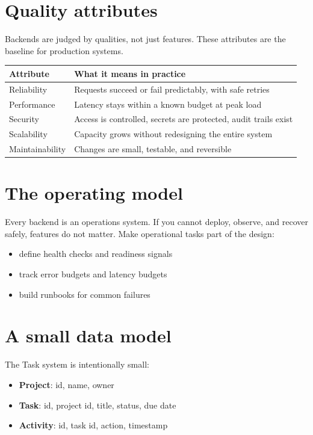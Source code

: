 \section{Quality attributes}
Backends are judged by qualities, not just features.
These attributes are the baseline for production systems.

\begin{tabularx}{\textwidth}{@{}lX@{}}
\toprule
Attribute & What it means in practice \\
\midrule
Reliability & Requests succeed or fail predictably, with safe retries \\
Performance & Latency stays within a known budget at peak load \\
Security & Access is controlled, secrets are protected, audit trails exist \\
Scalability & Capacity grows without redesigning the entire system \\
Maintainability & Changes are small, testable, and reversible \\
\bottomrule
\end{tabularx}

\section{The operating model}
Every backend is an operations system.
If you cannot deploy, observe, and recover safely, features do not matter.
Make operational tasks part of the design:
\begin{itemize}[nosep]
  \item define health checks and readiness signals
  \item track error budgets and latency budgets
  \item build runbooks for common failures
\end{itemize}

\section{A small data model}
The Task system is intentionally small:
\begin{itemize}[nosep]
  \item \textbf{Project}: id, name, owner
  \item \textbf{Task}: id, project id, title, status, due date
  \item \textbf{Activity}: id, task id, action, timestamp
\end{itemize}

